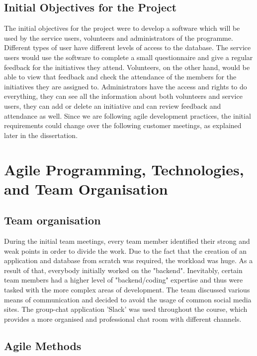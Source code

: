 \documentclass{l3proj}
\begin{document}
\subsection{Initial Objectives for the Project}
\label{sec:initial-objectives}

The initial objectives for the project were to develop a software which will be used by the service users, volunteers and administrators of the programme. Different types of user have different levels of access to the database. The service users would use the software to complete a small questionnaire and give a regular feedback for the initiatives they attend. Volunteers, on the other hand, would be able to view that feedback and check the attendance of the members for the initiatives they are assigned to. Administrators have the access and rights to do everything, they can see all the information about both volunteers and service users, they can add or delete an initiative and can review feedback and attendance as well. Since we are following agile development practices, the initial requirements could change over the following customer meetings, as explained later in the dissertation.

\section{Agile Programming, Technologies, and Team Organisation}

\subsection{Team organisation}
\label{organisation}

During the initial team meetings, every team member identified their strong and weak points in order to divide the work. Due to the fact that the creation of an application and database from scratch was required, the workload was huge. As a result of that, everybody initially worked on the "backend". Inevitably, certain team members had a higher level of "backend/coding" expertise and thus were tasked with the more complex areas of development.
The team discussed various means of communication and decided to avoid the usage of common social media sites. The group-chat application 'Slack' was used throughout the course, which provides a more organised and professional chat room with different channels.

\subsection{Agile Methods}
\label{agile}
\end{document}
